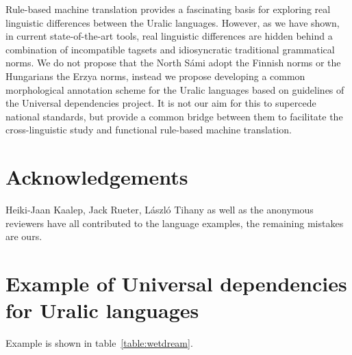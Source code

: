 \documentclass[free]{flammie}
\begin{document}
Rule-based machine translation provides a fascinating basis for exploring real linguistic differences between the Uralic languages. However, as we have shown, in current state-of-the-art tools, real linguistic differences are hidden behind a combination of incompatible tagsets and idiosyncratic traditional grammatical norms. We do not propose that the North Sámi adopt the Finnish norms or the Hungarians the Erzya norms, instead we propose developing a common morphological annotation scheme for the Uralic languages based on guidelines of the Universal dependencies project. It is not our aim for this to supercede national standards, but provide a common bridge between them to facilitate the cross-linguistic study and functional rule-based machine translation.

\section*{Acknowledgements}
Heiki-Jaan Kaalep, Jack Rueter, László Tihany as well as the anonymous reviewers have all contributed to the language examples, the remaining mistakes are ours.

\appendix

\section{Example of Universal dependencies for Uralic languages}

Example is shown in table~\ref{table:wetdream}.
\end{document}
